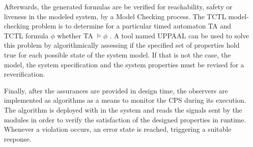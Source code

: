 Afterwards, the generated formulas are be verified for reachability, safety or liveness in the modeled system, by a Model Checking process. The TCTL model-checking problem is to determine for a particular timed automaton TA and TCTL formula \(\phi\) whether TA  \(\vDash \phi\) \cite{2008PrinciplesModelChecking}. A tool named UPPAAL \cite{UPPAAL} can be used to solve this problem by algorithmically assessing if the specified set of properties hold true for each possible state of the system model. If that is not the case, the model, the system specification and the system properties must be revised for a reverification.

Finally, after the assurances are provided in design time, the observers are implemented as algorithms as a means to monitor the CPS during its execution. The algorithm is deployed with in the system and reads the signals sent by the modules in order to verify the satisfaction of the designed properties in runtime. Whenever a violation occurs, an error state is reached, triggering a suitable response.




